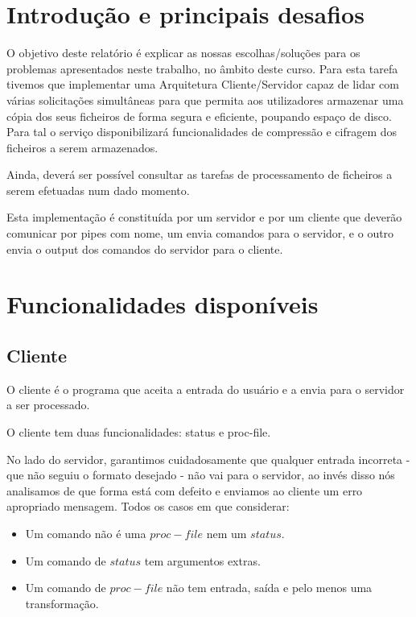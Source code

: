 \documentclass[a4paper]{report}
\begin{document}
	\tableofcontents
	
	\pagebreak
	
	\chapter{Introdução e principais desafios}
	
	O objetivo deste relatório é explicar as nossas escolhas/soluções para os problemas apresentados neste trabalho, no âmbito deste curso. Para esta tarefa tivemos que implementar uma Arquitetura Cliente/Servidor capaz de lidar com várias solicitações simultâneas para que permita aos utilizadores armazenar uma cópia dos seus ficheiros de forma segura e eficiente, poupando espaço de disco. Para tal o serviço disponibilizará funcionalidades de compressão e cifragem dos ficheiros a serem armazenados.

	Ainda, deverá ser possível consultar as tarefas de processamento de ficheiros a serem efetuadas num dado momento.
	
	Esta implementação é constituída por um servidor e por um cliente que deverão comunicar por pipes com nome, um envia comandos para o servidor, e o outro envia o output dos comandos do servidor para o cliente.
	
	
	\chapter{Funcionalidades disponíveis}
	\section{Cliente}
	O cliente é o programa que aceita a entrada do usuário e a envia para o servidor a ser processado.
	
	O cliente tem duas funcionalidades: status e proc-file. 
	
	No lado do servidor, garantimos cuidadosamente que qualquer entrada incorreta - que não seguiu o formato desejado - não vai para o servidor, ao invés disso nós analisamos de que forma está com defeito e enviamos ao cliente um erro apropriado mensagem. Todos os casos em que considerar:
	
    \begin{itemize}
        \item Um comando não é uma $proc-file$ nem um $status$.
        \item Um comando de $status$ tem argumentos extras.
        \item Um comando de $proc-file$ não tem entrada, saída e pelo menos uma transformação.
    \end{itemize}
    
\end{document}
